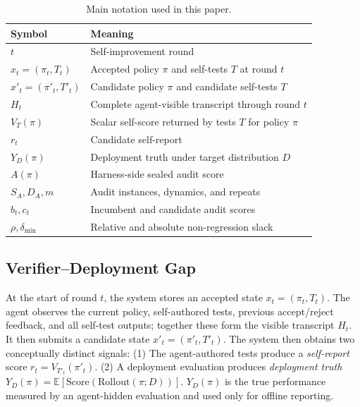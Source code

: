 \documentclass[letterpaper]{article} \usepackage{aaai2027}  \usepackage[hyphens]{url}  \usepackage{graphicx} \urlstyle{rm} \def\UrlFont{\rm}  \usepackage{natbib}  \usepackage{caption} \usepackage{amsfonts} \usepackage{multirow} \frenchspacing  \usepackage{algorithm}
\begin{document}
\begin{table}[t]
\centering
\footnotesize
\setlength{\tabcolsep}{3pt}
\renewcommand{\arraystretch}{1.0}
\begin{tabularx}{\linewidth}{lX}
\toprule
\textbf{Symbol} & \textbf{Meaning} \\
\midrule
$t$ & Self-improvement round \\
$x_t=(\pi_t,T_t)$ & Accepted policy $\pi$ and self-tests $T$ at round $t$ \\
$x'_t=(\pi'_t,T'_t)$ & Candidate policy $\pi$ and candidate self-tests $T$\\
$H_t$ & Complete agent-visible transcript through round $t$ \\
$V_T(\pi)$ & Scalar self-score returned by tests $T$ for policy $\pi$ \\
$r_t$ & Candidate self-report \\
$Y_D(\pi)$ & Deployment truth under target distribution $D$ \\
$A(\pi)$ & Harness-side sealed audit score \\
$S_A,D_A,m$ & Audit instances, dynamics, and repeats \\
$b_t,c_t$ & Incumbent and candidate audit scores \\
$\rho,\delta_{\min}$ & Relative and absolute non-regression slack \\
\bottomrule
\end{tabularx}
\caption{Main notation used in this paper.}
\label{tab:symbols}
\end{table}


\subsection{Verifier--Deployment Gap}










At the start of round $t$, the system stores an accepted state $x_t=(\pi_t,T_t)$. The agent observes the current policy, self-authored tests, previous accept/reject feedback, and all self-test outputs; together these form the visible transcript $H_t$. It then submits a candidate state $x'_t=(\pi'_t,T'_t)$. The system then obtains two conceptually distinct signals:
(1) The agent-authored tests produce a \emph{self-report} score $r_t = V_{T'_t}(\pi'_t)$.
(2) A deployment evaluation produces \emph{deployment truth} $Y_D(\pi)=\mathbb{E}\!\left[\mathrm{Score}(\mathrm{Rollout}(\pi;D))\right]$. $Y_D(\pi)$ is the true performance measured by an agent-hidden evaluation and used only for offline reporting.
\end{document}
